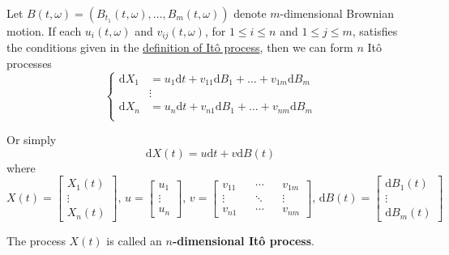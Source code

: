 \begin{definition}
    Let $B(t, \omega) = (B_{t_1}(t, \omega), \ldots , B_m(t, \omega))$ denote $m$-dimensional Brownian motion. If each $u_i(t, \omega)$ and $v_{ij}(t, \omega)$, for $1 \leq i \leq n$ and $1 \leq j \leq m$, satisfies the conditions given in the \hyperref[def:ito-process]{definition of Itô process}, then we can form $n$ Itô processes 
    \begin{equation*}
        \left\{\begin{aligned}
            \mathrm{d} X_1 &= u_1 \mathrm{d}t + v_{11}\mathrm{d}B_1 + \ldots + v_{1m}\mathrm{d}B_m \\
            &\vdots \\
            \mathrm{d} X_n &= u_n \mathrm{d}t + v_{n1}\mathrm{d}B_1 + \ldots + v_{nm}\mathrm{d}B_m \\ 
        \end{aligned}\right.
    \end{equation*}

    Or simply
    \[
        \mathrm{d}X(t) = u \mathrm{d}t + v \mathrm{d}B(t)
    \]
    where
    \[
        X(t) = \begin{bmatrix}
            X_1(t) \\
            \vdots \\
            X_n(t)
        \end{bmatrix}, \,
        u = \begin{bmatrix}
            u_1 \\
            \vdots \\
            u_n
        \end{bmatrix}, \,
        v = \begin{bmatrix}
            v_{11} && \cdots && v_{1m} \\
            \vdots && \ddots && \vdots \\
            v_{n1} && \cdots && v_{nm}
        \end{bmatrix}, \,
        \mathrm{d}B(t) = \begin{bmatrix}
            \mathrm{d}B_1(t) \\
            \vdots \\
            \mathrm{d}B_m(t)
        \end{bmatrix}
    \]

    The process $X(t)$ is called an \textbf{$n$-dimensional Itô process}.
\end{definition}

